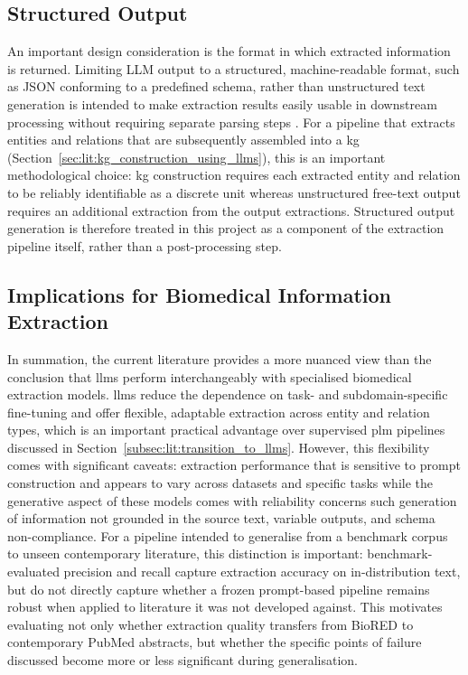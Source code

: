 \subsection{Structured Output}
\label{subsec:lit:structured_output}
An important design consideration is the format in which extracted information is returned. Limiting LLM output to a structured, machine-readable format, such as JSON conforming to a predefined schema, rather than unstructured text generation is intended to make extraction results easily usable in downstream processing without requiring separate parsing steps \cite{brokman2025benchmark}. For a pipeline that extracts entities and relations that are subsequently assembled into a \gls{kg} (Section~\ref{sec:lit:kg_construction_using_llms}), this is an important methodological choice: \gls{kg} construction requires each extracted entity and relation to be reliably identifiable as a discrete unit whereas unstructured free-text output requires an additional extraction from the output extractions. Structured output generation is therefore treated in this project as a component of the extraction pipeline itself, rather than a post-processing step.

\subsection{Implications for Biomedical Information Extraction}
\label{subsec:lit:implications_for_biomedical_information_extraction}
In summation, the current literature provides a more nuanced view than the conclusion that \glspl{llm} perform interchangeably with specialised biomedical extraction models. \glspl{llm} reduce the dependence on task- and subdomain-specific fine-tuning and offer flexible, adaptable extraction across entity and relation types, which is an important practical advantage over supervised \gls{plm} pipelines discussed in Section~\ref{subsec:lit:transition_to_llms}. However, this flexibility comes with significant caveats: extraction performance that is sensitive to prompt construction and appears to vary across datasets and specific tasks while the generative aspect of these models comes with reliability concerns such generation of information not grounded in the source text, variable outputs, and schema non-compliance. For a pipeline intended to generalise from a benchmark corpus to unseen contemporary literature, this distinction is important: benchmark-evaluated precision and recall capture extraction accuracy on in-distribution text, but do not directly capture whether a frozen prompt-based pipeline remains robust when applied to literature it was not developed against. This motivates evaluating not only whether extraction quality transfers from BioRED to contemporary PubMed abstracts, but whether the specific points of failure discussed become more or less significant during generalisation.

